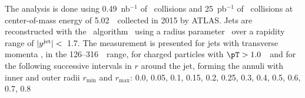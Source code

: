 The analysis is done using 0.49~nb$^{-1}$ of \pbpb\ collisions and 
25~pb$^{-1}$ of \pp\ collisions at center-of-mass energy of 5.02~\TeV\ collected in 2015 by ATLAS.
Jets are reconstructed with the \antikt\ algorithm~\cite{Cacciari:2008qp} using a radius parameter \RFour\ over a rapidity range of $|\mbox{$y^{\mathrm{jet}}$}| <$~1.7. The measurement is presented for jets with transverse momenta \ptjet, in the 126--316~\GeV\ range, for charged particles with $\pT>1.0$~\GeV\ and for the following successive intervals in $r$ around the jet, forming the annuli with inner and outer radii $r_{\textrm{min}}$ and $r_{\textrm{max}}$: 0.0, 0.05, 0.1, 0.15, 0.2, 0.25, 0.3, 0.4, 0.5, 0.6, 0.7, 0.8

